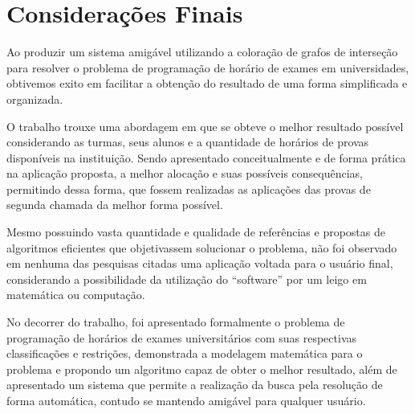 \chapter{Considerações Finais}
\label{cap:conclusao}


Ao produzir um sistema amigável utilizando a coloração de grafos de interseção para resolver o problema de programação de horário de exames em universidades, obtivemos exito em facilitar a obtenção do resultado de uma forma simplificada e organizada.

O trabalho trouxe uma abordagem em que se obteve o melhor resultado possível considerando as turmas, seus alunos e a quantidade de horários de provas disponíveis na instituição. Sendo apresentado conceitualmente e de forma prática na aplicação proposta, a melhor alocação e suas possíveis consequências, permitindo dessa forma, que fossem realizadas as aplicações das provas de segunda chamada da melhor forma possível.


Mesmo possuindo vasta quantidade e qualidade de referências e propostas de algoritmos eficientes que objetivassem solucionar o problema, não foi observado em nenhuma das pesquisas citadas uma aplicação voltada para o usuário final, considerando a possibilidade da utilização do “software” por um leigo em matemática ou computação.

No decorrer do trabalho, foi apresentado formalmente o problema de programação de horários de exames universitários com suas respectivas classificações e restrições, demonstrada a modelagem matemática para o problema e propondo um algoritmo capaz de obter o melhor resultado, além de apresentado um sistema que permite a realização da busca pela resolução de forma automática, contudo se mantendo amigável para qualquer usuário.

